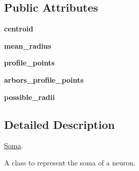 \subsection*{Public Attributes}
\begin{DoxyCompactItemize}
\item 
{\bfseries centroid}\hypertarget{classmeshy_1_1neuromorphovis_1_1skeleton_1_1structure_1_1soma_1_1Soma_a6ac421394d73f791724bc894cd01aeb0}{}\label{classmeshy_1_1neuromorphovis_1_1skeleton_1_1structure_1_1soma_1_1Soma_a6ac421394d73f791724bc894cd01aeb0}

\item 
{\bfseries mean\+\_\+radius}\hypertarget{classmeshy_1_1neuromorphovis_1_1skeleton_1_1structure_1_1soma_1_1Soma_a475e777e256e1585fc54e7504957915f}{}\label{classmeshy_1_1neuromorphovis_1_1skeleton_1_1structure_1_1soma_1_1Soma_a475e777e256e1585fc54e7504957915f}

\item 
{\bfseries profile\+\_\+points}\hypertarget{classmeshy_1_1neuromorphovis_1_1skeleton_1_1structure_1_1soma_1_1Soma_a70b84b7bcef0febdfdc03d52aa5f2352}{}\label{classmeshy_1_1neuromorphovis_1_1skeleton_1_1structure_1_1soma_1_1Soma_a70b84b7bcef0febdfdc03d52aa5f2352}

\item 
{\bfseries arbors\+\_\+profile\+\_\+points}\hypertarget{classmeshy_1_1neuromorphovis_1_1skeleton_1_1structure_1_1soma_1_1Soma_abed2b83e27c20a9c3943c60187815e09}{}\label{classmeshy_1_1neuromorphovis_1_1skeleton_1_1structure_1_1soma_1_1Soma_abed2b83e27c20a9c3943c60187815e09}

\item 
{\bfseries possible\+\_\+radii}\hypertarget{classmeshy_1_1neuromorphovis_1_1skeleton_1_1structure_1_1soma_1_1Soma_a0102a26239400e19b5ab2e4bf19df9e9}{}\label{classmeshy_1_1neuromorphovis_1_1skeleton_1_1structure_1_1soma_1_1Soma_a0102a26239400e19b5ab2e4bf19df9e9}

\end{DoxyCompactItemize}


\subsection{Detailed Description}
\hyperlink{classmeshy_1_1neuromorphovis_1_1skeleton_1_1structure_1_1soma_1_1Soma}{Soma}. 

\begin{DoxyVerb}A class to represent the soma of a neuron. \end{DoxyVerb}
 

